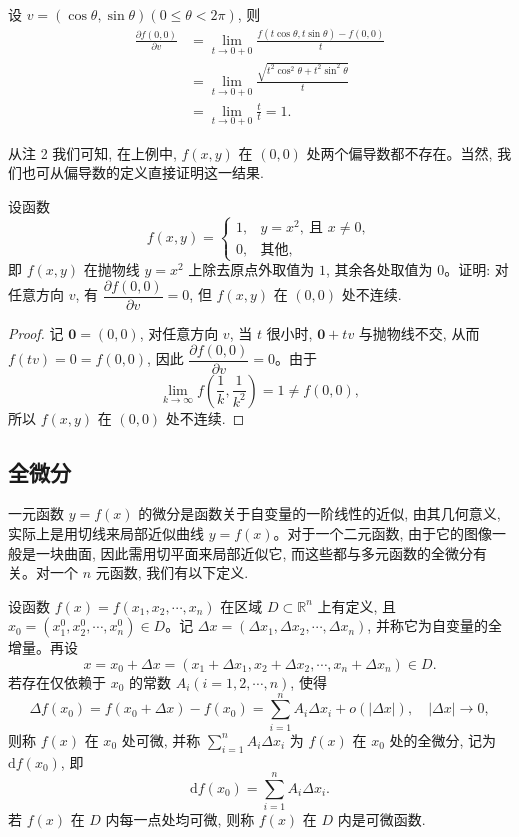\begin{solve}
设 $v=(\cos\theta,\sin\theta)(0\leqslant\theta<2\pi)$, 则
\[
\begin{aligned}
  \frac{\partial f(0,0)}{\partial v}
  &=\lim_{t\to0+0}
  \frac{f(t\cos\theta,t\sin\theta)-f(0,0)}{t}\\
  &=\lim_{t\to0+0}
  \frac{\sqrt{t^2\cos^2\theta+t^2\sin^2\theta}}{t}\\
  &=\lim_{t\to0+0}\frac{t}{t}=1.
\end{aligned}
\]

从注 2 我们可知, 在上例中, $f(x,y)$ 在 $(0,0)$ 处两个偏导数都不存在。当然, 我们也可从偏导数的定义直接证明这一结果.
\end{solve}


\begin{example}\label{example:ma-14-1-4}
设函数
\[
  f(x,y)=
  \begin{cases}
    1, & y=x^2,\ \text{且 } x\ne0,\\
    0, & \text{其他},
  \end{cases}
\]
即 $f(x,y)$ 在抛物线 $y=x^2$ 上除去原点外取值为 $1$, 其余各处取值为 $0$。证明: 对任意方向 $v$, 有 $\dfrac{\partial f(0,0)}{\partial v}=0$, 但 $f(x,y)$ 在 $(0,0)$ 处不连续.
\end{example}


\begin{proof}
记 $\mathbf 0=(0,0)$, 对任意方向 $v$, 当 $t$ 很小时, $\mathbf 0+tv$ 与抛物线不交, 从而 $f(tv)=0=f(0,0)$, 因此 $\dfrac{\partial f(0,0)}{\partial v}=0$。由于
\[
  \lim_{k\to\infty}f\left(\frac1k,\frac1{k^2}\right)=1\ne f(0,0),
\]
所以 $f(x,y)$ 在 $(0,0)$ 处不连续.
\end{proof}


\subsection{全微分}
\label{subsec:ma-14-1-3}

一元函数 $y=f(x)$ 的微分是函数关于自变量的一阶线性的近似, 由其几何意义, 实际上是用切线来局部近似曲线 $y=f(x)$。对于一个二元函数, 由于它的图像一般是一块曲面, 因此需用切平面来局部近似它, 而这些都与多元函数的全微分有关。对一个 $n$ 元函数, 我们有以下定义.

\begin{definition}\label{definition:ma-14-1-3}
设函数 $f(x)=f(x_1,x_2,\cdots,x_n)$ 在区域 $D\subset\mathbb R^n$ 上有定义, 且 $x_0=(x_1^0,x_2^0,\cdots,x_n^0)\in D$。记 $\Delta x=(\Delta x_1,\Delta x_2,\cdots,\Delta x_n)$, 并称它为自变量的全增量。再设
\[
  x=x_0+\Delta x=(x_1+\Delta x_1,x_2+\Delta x_2,\cdots,x_n+\Delta x_n)\in D.
\]
若存在仅依赖于 $x_0$ 的常数 $A_i(i=1,2,\cdots,n)$, 使得
\[
  \Delta f(x_0)=f(x_0+\Delta x)-f(x_0)
  =\sum_{i=1}^n A_i\Delta x_i+o(|\Delta x|),\quad |\Delta x|\to0,
\]
则称 $f(x)$ 在 $x_0$ 处可微, 并称 $\sum\limits_{i=1}^n A_i\Delta x_i$ 为 $f(x)$ 在 $x_0$ 处的全微分, 记为 $\mathrm df(x_0)$, 即
\[
  \mathrm df(x_0)=\sum_{i=1}^n A_i\Delta x_i.
\]
若 $f(x)$ 在 $D$ 内每一点处均可微, 则称 $f(x)$ 在 $D$ 内是可微函数.
\end{definition}

